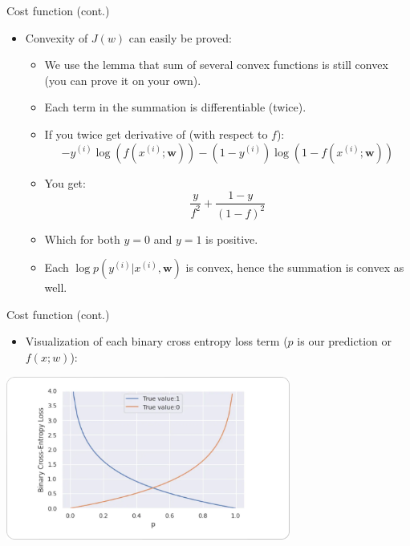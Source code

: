 \documentclass[serif, aspectratio=169]{beamer}
\begin{document}
\begin{frame}{Cost function (cont.)}
    \begin{itemize}
    \item Convexity of $J(w)$ can easily be proved:
        \begin{itemize}
            \item We use the lemma that sum of several convex functions is still convex (you can prove it on your own).
            \item Each term in the summation is differentiable (twice).
            \item If you twice get derivative of (with respect to $f$):
                \[
                    -y^{(i)}\log (f(x^{(i)}; \mathbf{w})) - 
            (1-y^{(i)})\log (1 - f(x^{(i)}; \mathbf{w}))
                \]
            \item You get:
                \[
                    \frac{y}{f^2} + \frac{1-y}{(1-f)^2}
                \]
            \item Which for both $y=0$ and $y=1$ is positive.
            \item Each $\log p(y^{(i)}|x^{(i)}, \mathbf{w})$ is convex, hence the summation is convex as well.
        \end{itemize}
    \end{itemize}
\end{frame}
\begin{frame}{Cost function (cont.)}
    \begin{itemize}
    \item Visualization of each binary cross entropy loss term ($p$ is our prediction or $f(x;w)$):
    \end{itemize}
    \begin{center}
        \includegraphics[width=0.7\textwidth]{pic/BCE.png}
    \end{center}
    \vfill
\end{frame}
\end{document}
